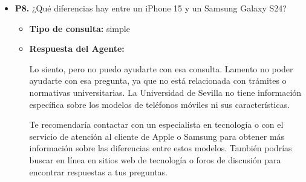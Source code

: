 \documentclass{article}
\begin{document}
\begin{itemize}
\begin{itemize}
                        Te recomendaría contactar con el departamento de cultura o comunicación de la universidad, ya que podrían tener recursos o sugerencias para crear contenido creativo como un poema para una felicitación de cumpleaños. También podrías buscar en línea o en redes sociales para encontrar ideas y ejemplos de poesías sobre la primavera que puedan inspirarte.
            \end{itemize}

      \item \textbf{P8.} ¿Qué diferencias hay entre un iPhone 15 y un Samsung Galaxy S24? \\
            \begin{itemize}
                  \item \textbf{Tipo de consulta:} simple
                  \item \textbf{Respuesta del Agente:}

                        Lo siento, pero no puedo ayudarte con esa consulta. Lamento no poder ayudarte con esa pregunta, ya que no está relacionada con trámites o normativas universitarias. La Universidad de Sevilla no tiene información específica sobre los modelos de teléfonos móviles ni sus características.

                        Te recomendaría contactar con un especialista en tecnología o con el servicio de atención al cliente de Apple o Samsung para obtener más información sobre las diferencias entre estos modelos. También podrías buscar en línea en sitios web de tecnología o foros de discusión para encontrar respuestas a tus preguntas.
            \end{itemize}

\end{itemize}
\end{document}
